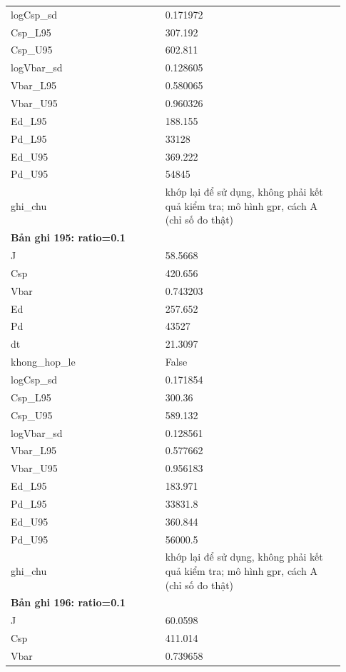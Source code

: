 \begin{longtable}{p{0.43\linewidth}p{0.50\linewidth}}
logCsp\_\allowbreak sd & 0.171972 \\
Csp\_\allowbreak L95 & 307.192 \\
Csp\_\allowbreak U95 & 602.811 \\
logVbar\_\allowbreak sd & 0.128605 \\
Vbar\_\allowbreak L95 & 0.580065 \\
Vbar\_\allowbreak U95 & 0.960326 \\
Ed\_\allowbreak L95 & 188.155 \\
Pd\_\allowbreak L95 & 33128 \\
Ed\_\allowbreak U95 & 369.222 \\
Pd\_\allowbreak U95 & 54845 \\
ghi\_\allowbreak chu & khớp lại để sử dụng, không phải kết quả kiểm tra; mô hình gpr, cách A (chỉ số đo thật) \\
\midrule
\multicolumn{2}{p{0.95\linewidth}}{\textbf{Bản ghi 195: ratio=0.1}} \\
J & 58.5668 \\
Csp & 420.656 \\
Vbar & 0.743203 \\
Ed & 257.652 \\
Pd & 43527 \\
dt & 21.3097 \\
khong\_\allowbreak hop\_\allowbreak le & False \\
logCsp\_\allowbreak sd & 0.171854 \\
Csp\_\allowbreak L95 & 300.36 \\
Csp\_\allowbreak U95 & 589.132 \\
logVbar\_\allowbreak sd & 0.128561 \\
Vbar\_\allowbreak L95 & 0.577662 \\
Vbar\_\allowbreak U95 & 0.956183 \\
Ed\_\allowbreak L95 & 183.971 \\
Pd\_\allowbreak L95 & 33831.8 \\
Ed\_\allowbreak U95 & 360.844 \\
Pd\_\allowbreak U95 & 56000.5 \\
ghi\_\allowbreak chu & khớp lại để sử dụng, không phải kết quả kiểm tra; mô hình gpr, cách A (chỉ số đo thật) \\
\midrule
\multicolumn{2}{p{0.95\linewidth}}{\textbf{Bản ghi 196: ratio=0.1}} \\
J & 60.0598 \\
Csp & 411.014 \\
Vbar & 0.739658 \\

\end{longtable}
